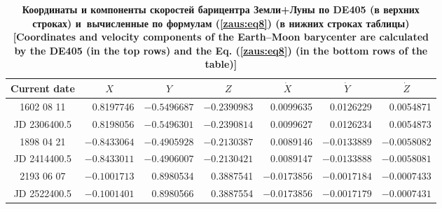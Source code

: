 \begin{table}
\begin{minipage}[t]{160mm}
\caption{\bf Координаты и компоненты скоростей барицентра Земли+Луны  по DE405 (в верхних строках) и~вычисленные по формулам  (\ref{zaus:eq8}) (в нижних строках таблицы) [Coordinates and velocity components of the Earth--Moon barycenter  are calculated by the  DE405 (in the top rows) and the Eq. (\ref{zaus:eq8}) (in the bottom rows of the table)]
\vspace{-3mm}}
\begin{tabular}{|c|r|r|r|r|r|r|}
\hline
\footnotesize
\rule{0mm}{12pt}%
Current date & \multicolumn{1}{c|}{\footnotesize $X$}&	\multicolumn{1}{c|}{\footnotesize $Y$}&	\multicolumn{1}{c|}{\footnotesize $Z$}&	\multicolumn{1}{c|}{\footnotesize $\dot{X}$}&	\multicolumn{1}{c|}{\footnotesize $\dot{Y}$}&	\multicolumn{1}{c|}{\footnotesize$\dot{Z}$}\\ \hline
\rule{0mm}{14pt}%
%
1602 08 11&	0.8197746&	$-0.5496687$&	$-0.2390983$&	0.0099635&	0.0126229&	  0.0054871\\
JD 2306400.5&	0.8198056&	$-0.5496301$&	$-0.2390814$&	0.0099627&	0.0126234&	  0.0054873\\ \hline
1898 04 21&	$-0.8433064$ &	$-0.4905928$ &	$-0.2130387$&	 0.0089146& 	$-0.0133889$&	  $-0.0058082$\\
JD 2414400.5&	$-0.8433011$ &	$-0.4906007$ &	$-0.2130421$&	 0.0089147 &	$-0.0133888$&	  $-0.0058081$\\ \hline
2193 06 07&	$-0.1001713$&	0.8980534&	0.3887541&	$-0.0173856$&	$-0.0017184$&	 $-0.0007433$ \\
JD 2522400.5&	$-0.1001401$&	0.8980566&	0.3887554&	$-0.0173856$&	$-0.0017179$&	 $-0.0007431$ \\ \hline
\end{tabular}
\label{table:zausaev:tabl5}
\end{minipage}

\end{table}









